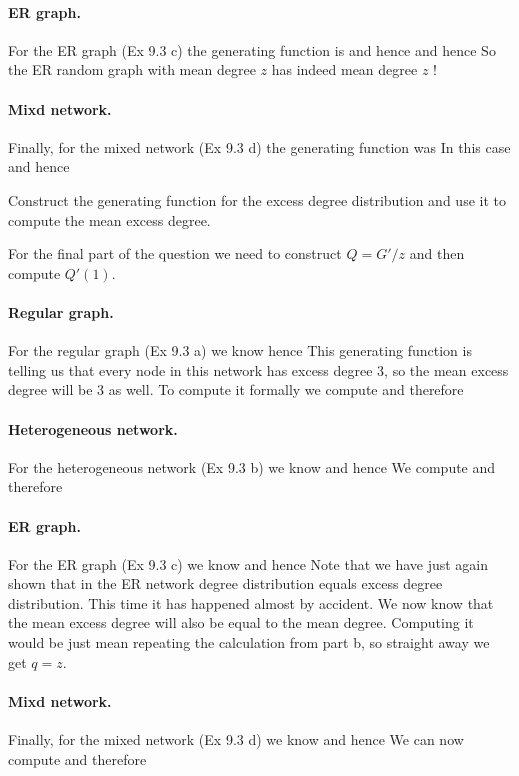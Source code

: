 \paragraph{ER graph.}For the ER graph (Ex 9.3 c) the generating function is 
and hence 
and hence 
So the ER random graph with mean degree $z$ has indeed mean degree $z$ !

\paragraph{Mixd network.}Finally, for the mixed network (Ex 9.3 d) the generating function was  
In this case 
and hence

\subquestion Construct the generating function for the excess degree distribution and use it to compute the mean excess degree. 

\solution
For the final part of the question we need to construct $Q=G'/z$ and then compute $Q'(1)$.

\paragraph{Regular graph.}For the regular graph (Ex 9.3 a) we know 
hence 
This generating function is telling us that every node in this network has excess degree 3, so the mean excess degree will be 3 as well. To compute it formally we compute 
and therefore

\paragraph{Heterogeneous network.}For the heterogeneous network (Ex 9.3 b) we know
and hence 
We compute 
and therefore

\paragraph{ER graph.}For the ER graph (Ex 9.3 c) we know 
and hence 
Note that we have just again shown that in the ER network degree distribution equals excess degree distribution. This time it has happened almost by accident. We now know that the mean excess degree will also be equal to the mean degree. Computing it would be just mean repeating the calculation from part b, so straight away we get $q=z$.

\paragraph{Mixd network.}Finally, for the mixed network (Ex 9.3 d) we know  
and hence 
We can now compute
and therefore
